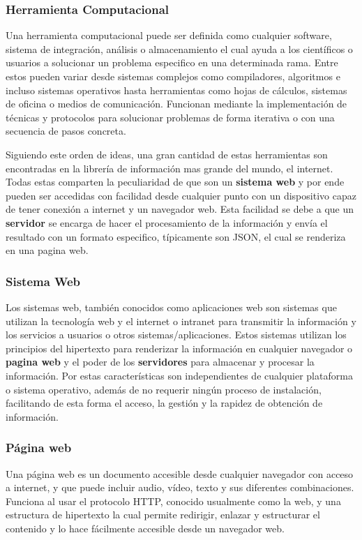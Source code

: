 \subsubsection{Herramienta Computacional}


Una herramienta computacional puede ser definida como cualquier software,
sistema de integración, análisis o almacenamiento el cual ayuda a los científicos
o usuarios a solucionar un problema especifico en una determinada rama. Entre
estos pueden variar desde sistemas complejos como compiladores, algoritmos
e incluso sistemas operativos hasta herramientas como hojas de cálculos, sistemas
de oficina o medios de comunicación. Funcionan mediante la implementación de
técnicas y protocolos para solucionar problemas de forma iterativa o con una
secuencia de pasos concreta.

Siguiendo este orden de ideas, una gran cantidad de estas herramientas son
encontradas en la librería de información mas grande del mundo, el internet.
Todas estas comparten la peculiaridad de que son un \textbf{sistema web} y por
ende pueden
ser accedidas con facilidad desde cualquier punto con un dispositivo capaz de
tener conexión a internet y un navegador web. Esta facilidad se debe a que un
\textbf{servidor} se encarga de hacer el procesamiento de la información y envía
el resultado con un formato especifico, típicamente son  JSON, el cual se renderiza
en una pagina web.

\subsubsection{Sistema Web}

Los sistemas web, también conocidos como aplicaciones web son sistemas que
utilizan la tecnología web y el internet o intranet para transmitir la
información y los
servicios a usuarios o otros sistemas/aplicaciones. Estos sistemas utilizan los
principios del hipertexto para renderizar la información en cualquier
navegador o \textbf{pagina web} y el poder de los \textbf{servidores} para
almacenar y procesar la información. Por estas características son independientes
de cualquier plataforma o sistema operativo, además de  no requerir ningún
proceso de instalación, facilitando de esta forma el acceso, la gestión y la
rapidez de obtención de información.



\subsubsection*{Página web}
Una página web es un documento accesible desde cualquier navegador con acceso
a internet, y que puede incluir audio, vídeo, texto y sus diferentes
combinaciones.
Funciona al usar el protocolo HTTP, conocido usualmente como la web, y una
estructura de hipertexto la cual permite redirigir, enlazar y estructurar el
contenido y lo hace fácilmente accesible desde un navegador web.

